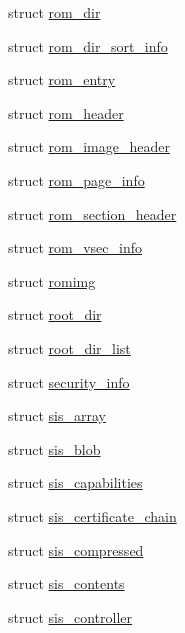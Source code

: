 \begin{DoxyCompactItemize}
\item 
struct \mbox{\hyperlink{structeka2l1_1_1loader_1_1rom__dir}{rom\+\_\+dir}}
\item 
struct \mbox{\hyperlink{structeka2l1_1_1loader_1_1rom__dir__sort__info}{rom\+\_\+dir\+\_\+sort\+\_\+info}}
\item 
struct \mbox{\hyperlink{structeka2l1_1_1loader_1_1rom__entry}{rom\+\_\+entry}}
\item 
struct \mbox{\hyperlink{structeka2l1_1_1loader_1_1rom__header}{rom\+\_\+header}}
\item 
struct \mbox{\hyperlink{structeka2l1_1_1loader_1_1rom__image__header}{rom\+\_\+image\+\_\+header}}
\item 
struct \mbox{\hyperlink{structeka2l1_1_1loader_1_1rom__page__info}{rom\+\_\+page\+\_\+info}}
\item 
struct \mbox{\hyperlink{structeka2l1_1_1loader_1_1rom__section__header}{rom\+\_\+section\+\_\+header}}
\item 
struct \mbox{\hyperlink{structeka2l1_1_1loader_1_1rom__vsec__info}{rom\+\_\+vsec\+\_\+info}}
\item 
struct \mbox{\hyperlink{structeka2l1_1_1loader_1_1romimg}{romimg}}
\item 
struct \mbox{\hyperlink{structeka2l1_1_1loader_1_1root__dir}{root\+\_\+dir}}
\item 
struct \mbox{\hyperlink{structeka2l1_1_1loader_1_1root__dir__list}{root\+\_\+dir\+\_\+list}}
\item 
struct \mbox{\hyperlink{structeka2l1_1_1loader_1_1security__info}{security\+\_\+info}}
\item 
struct \mbox{\hyperlink{structeka2l1_1_1loader_1_1sis__array}{sis\+\_\+array}}
\item 
struct \mbox{\hyperlink{structeka2l1_1_1loader_1_1sis__blob}{sis\+\_\+blob}}
\item 
struct \mbox{\hyperlink{structeka2l1_1_1loader_1_1sis__capabilities}{sis\+\_\+capabilities}}
\item 
struct \mbox{\hyperlink{structeka2l1_1_1loader_1_1sis__certificate__chain}{sis\+\_\+certificate\+\_\+chain}}
\item 
struct \mbox{\hyperlink{structeka2l1_1_1loader_1_1sis__compressed}{sis\+\_\+compressed}}
\item 
struct \mbox{\hyperlink{structeka2l1_1_1loader_1_1sis__contents}{sis\+\_\+contents}}
\item 
struct \mbox{\hyperlink{structeka2l1_1_1loader_1_1sis__controller}{sis\+\_\+controller}}
\item 

\end{DoxyCompactItemize}

